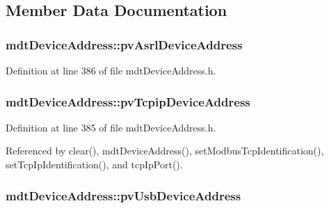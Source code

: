 \subsection{Member Data Documentation}
\hypertarget{classmdt_device_address_a9c88611c608194aaa9a439fd26b5603e}{
\subsubsection[{pv\-Asrl\-Device\-Address}]{ mdt\-Device\-Address\-::pv\-Asrl\-Device\-Address}}\label{classmdt_device_address_a9c88611c608194aaa9a439fd26b5603e}


Definition at line 386 of file mdt\-Device\-Address.\-h.

\hypertarget{classmdt_device_address_afd6ac6af312038f5c94a635b37a7cf54}{
\subsubsection[{pv\-Tcpip\-Device\-Address}]{ mdt\-Device\-Address\-::pv\-Tcpip\-Device\-Address}}\label{classmdt_device_address_afd6ac6af312038f5c94a635b37a7cf54}


Definition at line 385 of file mdt\-Device\-Address.\-h.



Referenced by clear(), mdt\-Device\-Address(), set\-Modbus\-Tcp\-Identification(), set\-Tcp\-Ip\-Identification(), and tcp\-Ip\-Port().

\hypertarget{classmdt_device_address_a4a049c594dc631ada14b3697244d4bff}{
\subsubsection[{pv\-Usb\-Device\-Address}]{ mdt\-Device\-Address\-::pv\-Usb\-Device\-Address}}\label{classmdt_device_address_a4a049c594dc631ada14b3697244d4bff}


